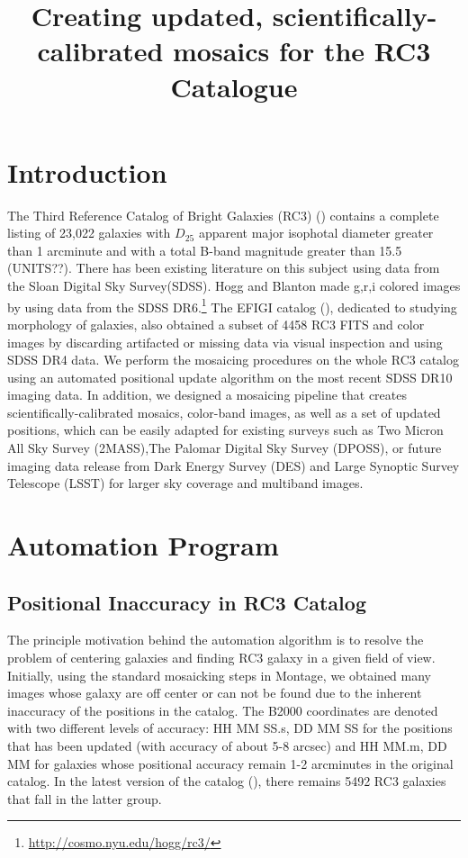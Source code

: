 \documentclass[5p]{elsarticle}
\begin{document}
\title{Creating updated, scientifically-calibrated mosaics for the RC3 Catalogue}
\maketitle 


\section{Introduction}
The Third Reference Catalog of Bright Galaxies (RC3) (\citet{rc3}) contains a  complete listing of 23,022 galaxies with $D_25$ apparent major isophotal diameter  greater than 1 arcminute and with a total B-band magnitude greater than 15.5 (UNITS??). There has been existing literature on this subject using data from the Sloan Digital Sky Survey(SDSS). Hogg and Blanton made g,r,i colored images by using data from the SDSS DR6.\footnote{\url{http://cosmo.nyu.edu/hogg/rc3/}} The EFIGI catalog (\citet{efigi}), dedicated to studying morphology of galaxies, also  obtained a subset of 4458 RC3 FITS and color images by discarding artifacted or missing data via visual inspection and using SDSS DR4 data. We perform the mosaicing procedures on the whole RC3 catalog using  an automated positional update algorithm  on the most recent SDSS DR10 imaging data. In addition, we designed a mosaicing pipeline that creates scientifically-calibrated mosaics, color-band images, as well as a set of updated positions, which can be easily adapted for existing surveys such as Two Micron All Sky Survey  (2MASS),The Palomar Digital Sky Survey (DPOSS), or future imaging data release from  Dark Energy Survey (DES) and Large Synoptic Survey Telescope (LSST) for larger sky coverage and multiband images.
\section{Automation Program}

	\subsection{Positional Inaccuracy in RC3 Catalog}
	The principle motivation behind the automation algorithm is to resolve the problem of centering galaxies and finding RC3 galaxy in a given field of view. Initially, using the standard mosaicking steps in Montage, we obtained many images whose galaxy are off center or can not be found due to the inherent inaccuracy of the positions in the catalog. 
The B2000 coordinates are denoted with two different levels of accuracy: HH MM SS.s, DD MM SS for the positions that has been updated  (with accuracy of about 5-8 arcsec) and  HH MM.m, DD MM for galaxies whose positional accuracy remain  1-2 arcminutes in the original catalog.  In the latest version of the catalog (\citet{rc31991}), there remains 5492 RC3 galaxies that fall in the latter group.
\end{document}
